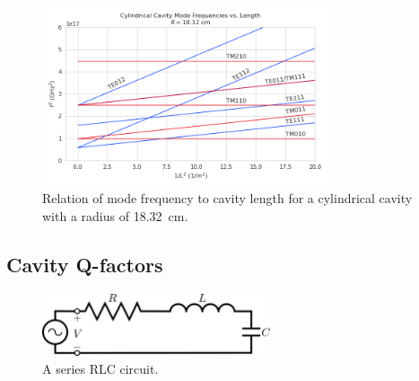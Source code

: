 \begin{figure}[htbp]
    \centering
    \includegraphics[width=0.75\textwidth]{figs/Chapter-6/230610_mode_lines.png}
    \caption{\label{fig:chap6-cavity-mode-lines} Relation of mode frequency to cavity length for a cylindrical cavity with a radius of 18.32~cm.}
\end{figure}

\subsection{Cavity Q-factors}

\begin{figure}[htbp]
    \centering
    \includegraphics*[width=0.6\textwidth]{figs/Chapter-6/230607_rlc.png}
    \caption{\label{fig:chap6-series-rlc} A series RLC circuit.}
\end{figure}

